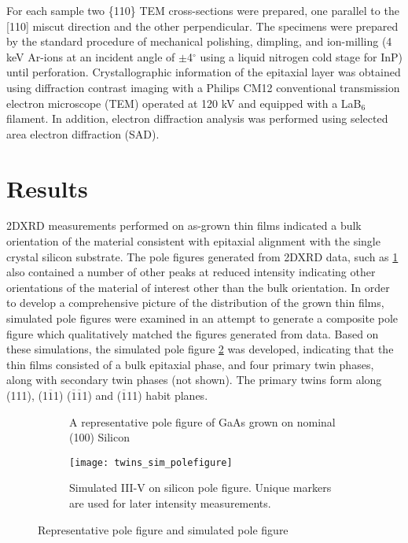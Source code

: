 For each sample two \{110\} TEM cross-sections were prepared, one parallel to 
the [110] miscut direction and the other perpendicular. The specimens were 
prepared by the standard procedure of mechanical polishing, dimpling, and 
ion-milling (4 keV Ar-ions at an incident angle of $\pm$4$^\circ$ using a 
liquid nitrogen cold stage for InP) until perforation. Crystallographic 
information of the epitaxial layer was obtained using diffraction contrast 
imaging with a Philips CM12 conventional transmission electron microscope 
(TEM) operated at 120 kV and equipped with a LaB$_6$ filament. In addition, 
electron diffraction analysis was performed using selected area electron 
diffraction (SAD).
\section{Results}
2DXRD measurements performed on as-grown thin films indicated a bulk 
orientation of the material consistent with epitaxial alignment with the 
single crystal silicon substrate. The pole figures generated from 2DXRD data, 
such as \cref{fig:twins_pole_example} also contained a number of other peaks 
at reduced intensity indicating other orientations of the material of interest 
other than the bulk orientation. In order to develop a comprehensive picture 
of the distribution of the grown thin films, simulated pole figures were 
examined in an attempt to generate a composite pole figure which qualitatively 
matched the figures generated from data. Based on these simulations, the 
simulated pole figure \cref{fig:twins_sim_polefigure} was developed, 
indicating that the thin films consisted of a bulk epitaxial phase, and four 
primary twin phases, along with secondary twin phases (not shown). The primary twins form 
along (111), (1$\overline{1}$1) ($\overline{1}\overline{1}$1) and ($\overline{1}$11) 
habit planes.
\begin{figure}
    \begin{subfigure}[b]{0.5\linewidth}
        \centering
        \caption{A representative pole figure of GaAs grown on nominal (100) 
        Silicon\label{fig:twins_pole_example}}
    \end{subfigure}
    \begin{subfigure}[b]{0.5\linewidth}
        \centering
        \texttt{[image: twins\_sim\_polefigure]}
        \caption{Simulated III-V on silicon pole figure. Unique markers are used 
        for later intensity measurements.\label{fig:twins_sim_polefigure}}
    \end{subfigure}
    \caption{\label{fig:polefigure_example}Representative pole figure and simulated pole 
    figure}
\end{figure}

